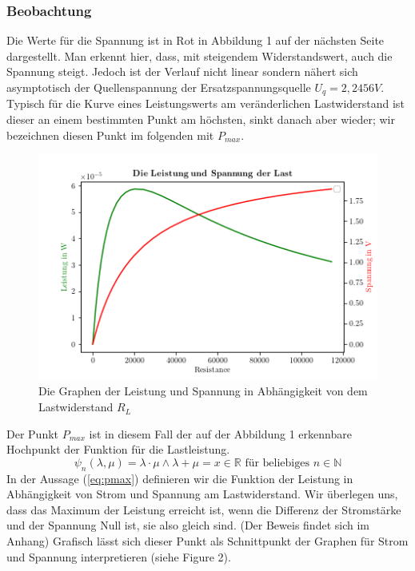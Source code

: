 \documentclass{scrarticle}
\begin{document}
\subsubsection{Beobachtung}
Die Werte für die Spannung ist in Rot in Abbildung 1 auf der nächsten Seite dargestellt. Man erkennt hier, dass, mit steigendem Widerstandswert,
auch die Spannung steigt. Jedoch ist der Verlauf nicht linear sondern nähert sich asymptotisch der Quellenspannung der Ersatzspannungsquelle
$U_q = 2,2456V$.
Typisch für die Kurve eines Leistungswerts am veränderlichen Lastwiderstand ist dieser an einem bestimmten Punkt am höchsten, sinkt danach aber wieder; wir bezeichnen
diesen Punkt im folgenden mit $P_{max}$.
\begin{figure}
  \begin{center}
    \includegraphics[scale=0.5]{pw_volt.png}
    \caption{Die Graphen der Leistung und Spannung in Abhängigkeit von dem Lastwiderstand $R_L$}
  \end{center}
\end{figure}
Der Punkt $P_{max}$ ist in diesem Fall der auf der Abbildung 1 erkennbare Hochpunkt der Funktion für die Lastleistung.
\begin{equation}\label{eq:pmax}
  \psi_n(\lambda, \mu) = \lambda \cdot \mu \land \lambda + \mu = x \in \mathbb{R} \text{ für beliebiges }n\in\mathbb{N}
\end{equation}
In der Aussage (\ref{eq:pmax}) definieren wir die Funktion der Leistung in Abhängigkeit von Strom und Spannung am Lastwiderstand. Wir überlegen uns, dass das Maximum der Leistung erreicht ist, wenn die Differenz der Stromstärke und der Spannung Null ist, sie also gleich sind. (Der Beweis findet sich im Anhang)
Grafisch lässt sich dieser Punkt als Schnittpunkt der Graphen für Strom und Spannung interpretieren (siehe Figure 2).
\end{document}
